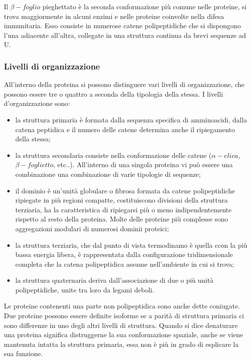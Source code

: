 Il $\beta-foglio$ pieghettato è la seconda conformazione più comune nelle proteine, si trova maggiormente in alcuni enzimi e nelle proteine coinvolte nella difesa 
immunitaria. Esso consiste in numerose catene polipeptidiche che si dispongono l'una adiacente all'altra, collegate in una struttura continua da brevi sequenze ad U.

\subsubsection{Livelli di organizzazione}\label{subsec:es_subsec}
All'interno della proteina si possono distinguere vari livelli di organizzazione, che possono essere tre o quattro a seconda della tipologia della stessa.
I livelli d'organizzazione sono: 
\vspace{10pt}
\begin{itemize}
    \item la struttura primaria è formata dalla sequenza specifica di amminoacidi, dalla catena peptidica e il numero delle catene determina anche il ripiegamento
    della stessa;
    \vspace{5pt}
    \item la struttura secondaria consiste nella conformazione delle catene ($\alpha-elica$, $\beta-foglietto$, etc..). All'interno di una singola proteina vi può 
    essere una combinazione una combinazione di varie tipologie di sequenze;
    \vspace{5pt}
    \item il dominio è un'unità globulare o fibrosa formata da catene polipeptidiche ripiegate in più regioni compatte, costituiscono divisioni della struttura 
    terziaria, ha la caratteristica di ripiegarsi più o meno indipendentemente rispetto al resto della proteina. Molte delle proteine più complesse sono 
    aggregazioni modulari di numerosi dominii proteici;
    \vspace{5pt} 
    \item la struttura terziaria, che dal punto di vista termodinamo è quella ccon la più bassa energia libera, è rappresentata dalla configurazione tridimensionale
    completa che la catena polipeptidica assume nell'ambiente in cui si trova;
    \vspace{5pt}
    \item la struttura quaternaria deriva dall'associazione di due o più unità polipeptidiche, unite tra loro da legami deboli.
\end{itemize} 

Le proteine contenenti una parte non polipeptidica sono anche dette coniugate. Due proteine possono essere definite isoforme se a parità di struttura primaria ci sono 
differenze in uno degli altri livelli di struttura. Quando si dice denaturare una proteina significa distruggerne la sua conformazione spaziale, anche se viene 
mantenuta intatta la struttura primaria, essa non è più in grado di esplicare la sua funzione.

